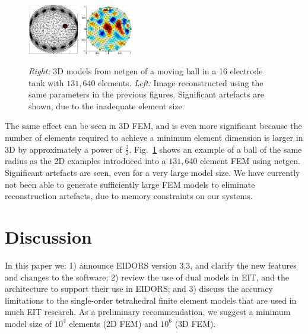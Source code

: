 \documentclass[letterpaper,twocolumn,10pt]{article}
\begin{document}
\begin{figure}[tbh]
\begin{center}
 \includegraphics[width= 0.20\textwidth]{figs/fig9a.png}
 \includegraphics[width= 0.20\textwidth]{figs/fig9b.png}
\caption{ \label{fig:netgen_3D}
\small
{\em Right:}
3D models from netgen \cite{schoeberl1997}
of a moving ball in a 16 electrode tank
with $131,640$ elements.
{\em Left:}
Image reconstructed using the same parameters
in the previous figures. Significant artefacts
are shown, due to the inadequate element size.
}
\end{center}
\vspace{-0.5cm}
\end{figure}


The same effect can be seen in 3D FEM, and is even
more significant because the number of elements
required to achieve a minimum element dimension
is larger in 3D by approximately a power of $\frac{3}{2}$.
Fig.~\ref{fig:netgen_3D} shows an example of a
ball of the same radius as the 2D examples introduced
into a $131,640$ element FEM using netgen\cite{schoeberl1997}.
Significant artefacts are seen, even for a very large
model size.
We have currently not been able to generate sufficiently
large FEM models to eliminate reconstruction
artefacts, due to memory constraints on our systems.


\section{Discussion}

In this paper we: 1) announce
EIDORS version 3.3, and clarify the new features and
changes to the software;
2) review the use of dual models in EIT, and
the architecture to support their use in EIDORS;
and
3) discuss the accuracy limitations to the single-order
tetrahedral finite element models that are used
in much EIT research. As a preliminary recommendation,
we suggest a minimum model size of $10^4$ elements
 (2D FEM) and $10^6$ (3D FEM).
\end{document}
